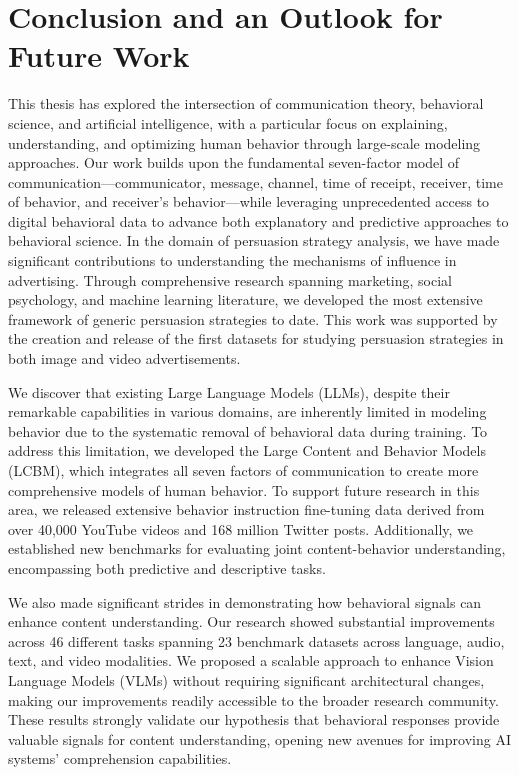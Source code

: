 \chapter{Conclusion and an Outlook for Future Work}
\label{chapter:conclusion}


This thesis has explored the intersection of communication theory, behavioral science, and artificial intelligence, with a particular focus on explaining, understanding, and optimizing human behavior through large-scale modeling approaches. Our work builds upon the fundamental seven-factor model of communication—communicator, message, channel, time of receipt, receiver, time of behavior, and receiver's behavior—while leveraging unprecedented access to digital behavioral data to advance both explanatory and predictive approaches to behavioral science.
In the domain of persuasion strategy analysis, we have made significant contributions to understanding the mechanisms of influence in advertising. Through comprehensive research spanning marketing, social psychology, and machine learning literature, we developed the most extensive framework of generic persuasion strategies to date. This work was supported by the creation and release of the first datasets for studying persuasion strategies in both image and video advertisements. 


We discover that existing Large Language Models (LLMs), despite their remarkable capabilities in various domains, are inherently limited in modeling behavior due to the systematic removal of behavioral data during training. To address this limitation, we developed the Large Content and Behavior Models (LCBM), which integrates all seven factors of communication to create more comprehensive models of human behavior. To support future research in this area, we released extensive behavior instruction fine-tuning data derived from over 40,000 YouTube videos and 168 million Twitter posts. Additionally, we established new benchmarks for evaluating joint content-behavior understanding, encompassing both predictive and descriptive tasks.


We also made significant strides in demonstrating how behavioral signals can enhance content understanding. Our research showed substantial improvements across 46 different tasks spanning 23 benchmark datasets across language, audio, text, and video modalities. We proposed a scalable approach to enhance Vision Language Models (VLMs) without requiring significant architectural changes, making our improvements readily accessible to the broader research community. These results strongly validate our hypothesis that behavioral responses provide valuable signals for content understanding, opening new avenues for improving AI systems' comprehension capabilities.


